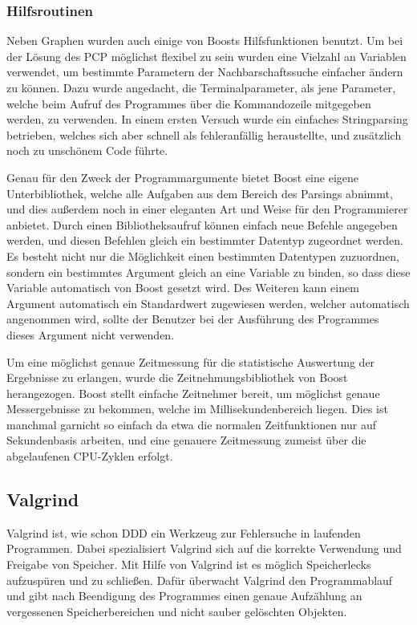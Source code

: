 \subsubsection{Hilfsroutinen}
Neben Graphen wurden auch einige von Boosts Hilfsfunktionen benutzt. Um bei der Lösung des PCP möglichst flexibel zu sein wurden eine Vielzahl an Variablen verwendet, um bestimmte Parametern der 
Nachbarschaftssuche einfacher ändern zu können. Dazu wurde angedacht, die Terminalparameter, als jene Parameter, welche beim Aufruf des Programmes über die Kommandozeile mitgegeben werden, zu verwenden. 
In einem ersten Versuch wurde ein einfaches Stringparsing betrieben, welches sich aber schnell als fehleranfällig heraustellte, und zusätzlich noch zu unschönem Code führte. 

Genau für den Zweck der Programmargumente bietet Boost eine eigene Unterbibliothek, welche alle Aufgaben aus dem Bereich des Parsings abnimmt, und dies außerdem noch in einer eleganten Art und Weise für
den Programmierer anbietet. Durch einen Bibliotheksaufruf können einfach neue Befehle angegeben werden, und diesen Befehlen gleich ein bestimmter Datentyp zugeordnet werden. Es besteht nicht nur die 
Möglichkeit einen bestimmten Datentypen zuzuordnen, sondern ein bestimmtes Argument gleich an eine Variable zu binden, so dass diese Variable automatisch von Boost gesetzt wird. Des Weiteren kann einem
Argument automatisch ein Standardwert zugewiesen werden, welcher automatisch angenommen wird, sollte der Benutzer bei der Ausführung des Programmes dieses Argument nicht verwenden. 

Um eine möglichst genaue Zeitmessung für die statistische Auswertung der Ergebnisse zu erlangen, wurde die Zeitnehmungsbibliothek von Boost herangezogen. Boost stellt einfache Zeitnehmer bereit, um 
möglichst genaue Messergebnisse zu bekommen, welche im Millisekundenbereich liegen. Dies ist manchmal garnicht so einfach da etwa die normalen Zeitfunktionen nur auf Sekundenbasis arbeiten, und eine 
genauere Zeitmessung zumeist über die abgelaufenen CPU-Zyklen erfolgt.

\subsection{Valgrind}
Valgrind ist, wie schon DDD ein Werkzeug zur Fehlersuche in laufenden Programmen. Dabei spezialisiert Valgrind sich auf die korrekte Verwendung und Freigabe von Speicher. Mit Hilfe von Valgrind ist es
möglich Speicherlecks aufzuspüren und zu schließen. Dafür überwacht Valgrind den Programmablauf und gibt nach Beendigung des Programmes einen genaue Aufzählung an vergessenen Speicherbereichen und 
nicht sauber gelöschten Objekten. 

